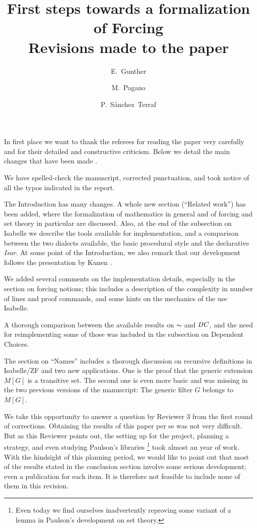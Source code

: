 \documentclass[11pt,english]{article}
\begin{document}
\title{First steps towards a formalization of Forcing
  \\ Revisions made to the paper}
\author{E.~Gunther \and  M.~Pagano \and P.~S\'anchez~Terraf
}
\date{}
\maketitle

In first place we want to thank the referees for reading the paper very
carefully and for their detailed and constructive criticism. Below we
detail the main changes that have been made%
.

We have spelled-check the manuscript, corrected punctuation, and took
notice of all the typos indicated in the report. 

The Introduction has many changes. A whole new section (``Related
work'') has been added, where the formalization of mathematics in
general and of forcing and set theory in particular are discussed.
Also, at the end of the subsection on Isabelle we describe the tools
available for implementation, and a comparison
between the two dialects available, the basic procedural style and the
declarative \emph{Isar}. At some point of the Introduction, we also
remark that our 
development follows the presentation by Kunen \cite{kunen2011set}. 

We added several comments on the implementation details, especially in
the section on forcing notions; this includes a description of the
complexity in number of lines and proof commands, and some hints on
the mechanics of the use Isabelle.

A thorough comparison between the available results on $\AC$ and
$\mathit{DC}$, and the need for reimplementing some of those was included in
the subsection on Dependent Choices.

The section on ``Names'' includes a thorough discussion on recursive
definitions in Isabelle/ZF and two new applications. One is the
proof that the generic
extension $M[G]$ is a transitive set. The second one is even more basic  and
was missing in the two previous versions of the manuscript: The
generic filter $G$ belongs to $M[G]$. 

We take this opportunity to answer a question by Reviewer 3 from the
first round of corrections. Obtaining the results of this paper per se
was not very difficult. But as this Reviewer points out, the setting
up for the project, planning a strategy, and even studying Paulson's
libraries%
\footnote{Even today we find ourselves inadvertently reproving some
  variant of a lemma in Paulson's development on set theory.}
took almost an year of work. With the hindsight of this planning period,
we would like to point out that most of the results stated in the
conclusion section involve some serious development; even  a
publication for each item. It is therefore not feasible to include
none of them in this revision.
%
%


\end{document}
